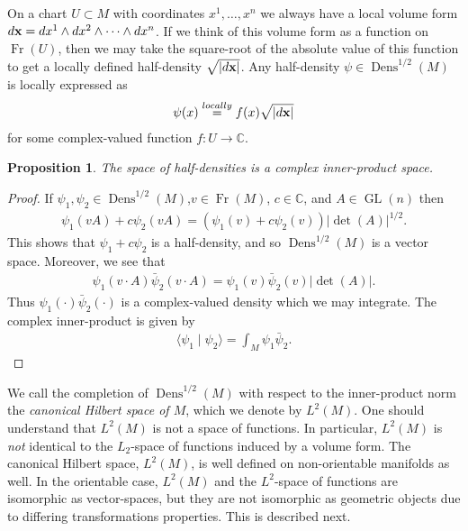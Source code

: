 \documentclass[12pt]{amsart}
\newtheorem{prop}{Proposition}
\DeclareMathOperator{\GL}{GL}
\DeclareMathOperator{\Fr}{Fr}
\DeclareMathOperator{\Dens}{Dens}
\begin{document}
On a chart $U \subset M$ with coordinates $x^1,\dots,x^n$ we always have a local volume form $d{\bf x} = dx^1\wedge dx^2 \wedge \cdots \wedge dx^n$.
If we think of this volume form as a function on $\Fr(U)$, then we may take the square-root of the absolute value of this function to get a locally defined half-density $\sqrt{ |d{\bf x}| }$.
Any half-density $\psi \in \Dens^{1/2}(M)$ is locally expressed as
\begin{align*}
  \psi(x) \stackrel{locally}{=} f(x) \sqrt{ |d {\bf x} | }
\end{align*}
for some complex-valued function $f:U \to \mathbb{C}$.

\begin{prop}
  The space of half-densities is a complex inner-product space.
\end{prop}
\begin{proof}
 If $\psi_1,\psi_2 \in \Dens^{1/2}(M)$,$v \in \Fr(M)$, $c \in \mathbb{C}$, and $A \in \GL(n)$ then
  \begin{align*}
    \psi_1( v A) + c  \psi_2(v A) = ( \psi_1(v) + c\psi_2(v) ) | \det(A) |^{1/2}.
  \end{align*}
  This shows that $\psi_1 + c \psi_2$ is a half-density, and so $\Dens^{1/2}(M)$ is a vector space.
  Moreover, we see that
  \begin{align*}
    \psi_1(v \cdot A) \bar{\psi}_2( v \cdot A) = \psi_1(v)\bar{\psi}_2(v) | \det(A) |.
  \end{align*}
  Thus $\psi_1( \cdot) \bar{\psi}_2( \cdot)$ is a complex-valued density which we may integrate.  The complex inner-product is given by
  \begin{align*}
    \langle \psi_1 \mid \psi_2 \rangle = \int_M \psi_1 \bar{\psi}_2.
  \end{align*}
\end{proof}

  We call the completion of $\Dens^{1/2}(M)$ with respect to the inner-product norm the \emph{canonical Hilbert space of $M$}, which we denote by $L^2(M)$.
One should understand that $L^2(M)$ is not a space of functions.
In particular, $L^2(M)$ is \emph{not} identical to the $L_2$-space of functions induced by a volume form.
The canonical Hilbert space, $L^2(M)$, is well defined on non-orientable manifolds as well.
In the orientable case, $L^2(M)$ and the $L^2$-space of functions are isomorphic as vector-spaces, but they are not isomorphic as geometric objects due to differing transformations properties.
This is described next.
\end{document}
